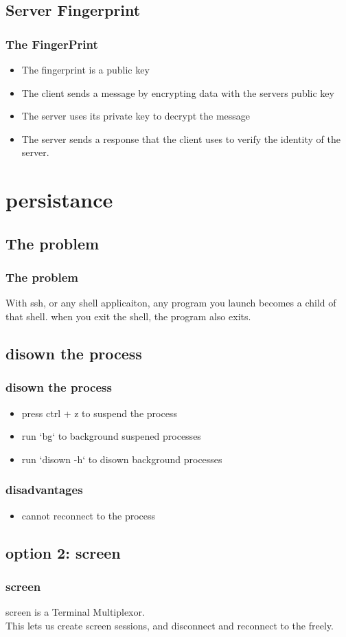 \documentclass[hyperref={pdfpagelabels=false}]{beamer}
\begin{document}
\subsection{Server Fingerprint}
\frame
{
    \frametitle{The FingerPrint}
    \begin{itemize}
    \item{The fingerprint is a public key}
    \item{The client sends a message by encrypting data with the servers public key}
    \item{The server uses its private key to decrypt the message}
    \item{The server sends a response that the client uses to verify the identity of the server.}
    \end{itemize}
}
\section{persistance}
\subsection{The problem}
\frame
{
    \frametitle{The problem}
    With ssh, or any shell applicaiton, any program you launch becomes a child of that shell.  when you exit the shell, the program also exits.

}
\subsection{disown the process}
\frame
{
  \frametitle{disown the process}
  \begin{itemize}
  \item{press ctrl + z to suspend the process}
  \item{run `bg` to background suspened processes}
  \item{run `disown -h` to disown background processes}
  \end{itemize}
}
\frame
{
    \frametitle{disadvantages}
    \begin{itemize}
    \item{cannot reconnect to the process}
    \end{itemize}
}
\subsection{option 2: screen}
\frame
{
  \frametitle{screen}
  screen is a Terminal Multiplexor.\\
  This lets us create screen sessions, and disconnect and reconnect to the freely.
}
\end{document}
